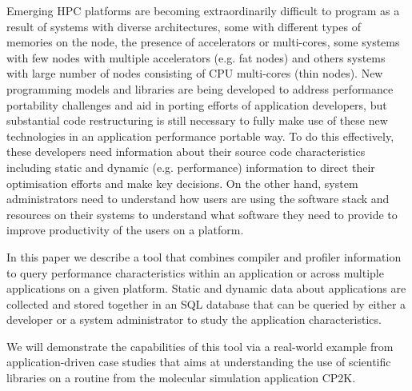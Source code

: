 Emerging HPC platforms are becoming extraordinarily difficult to program as a result of systems with diverse architectures, some with different types of memories on the node, the presence of accelerators or multi-cores, some systems with few nodes with multiple accelerators (e.g. fat nodes) and others systems with large number of nodes consisting of CPU multi-cores (thin nodes). New programming models and libraries are being developed to address performance portability challenges and aid in porting efforts of application developers, but substantial code restructuring is still necessary to fully make use of these new technologies in an application performance portable way. 
To do this effectively, these developers need information about their source code characteristics including static and dynamic (e.g. performance) information to direct their optimisation efforts and make key decisions.
On the other hand, system administrators need to understand how users are using the software stack and resources on their systems to understand what software they need to provide to improve  productivity of the users on a platform.

In this paper we describe a tool that combines compiler and profiler information to query performance characteristics within an application or across multiple applications on a given platform.
Static and dynamic data about applications are collected and stored together in an \acs{SQL} database that can be queried by either a developer or a system administrator to study the application characteristics.

We will demonstrate the capabilities of this tool via a real-world example from application-driven case studies that aims at understanding the use of scientific libraries on a routine from the molecular simulation application CP2K.
